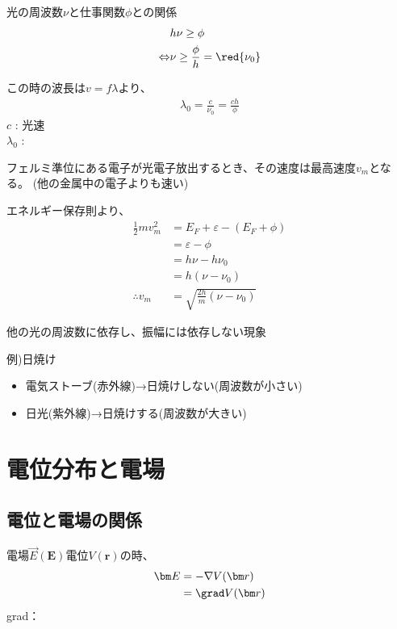 \documentclass[12pt]{ltjsarticle}
\begin{document}
光の周波数$\nu$と仕事関数$\phi$との関係
\begin{align*}
&h\nu\ge\phi\\
\Leftrightarrow&\nu\ge\frac\phi h=\red{\nu_0}
\end{align*}

この時の波長は$v=f\lambda$より、
\begin{align*}
\lambda_0=\frac c{\nu_0}=\frac{ch}\phi
\end{align*}
$c$ : 光速\\
$\lambda_0$ : 


フェルミ準位にある電子が光電子放出するとき、その速度は最高速度$v_m$となる。
(他の金属中の電子よりも速い)

エネルギー保存則より、
\begin{align*}
\frac12mv_m^2&=E_F+\varepsilon-(E_F+\phi)\\
&=\varepsilon-\phi\\
&=h\nu-h\nu_0\\
&=h(\nu-\nu_0)\\
\therefore v_m&=\sqrt{\frac{2h}m (\nu-\nu_0)}
\end{align*}

他の光の周波数に依存し、振幅には依存しない現象

例)日焼け
\begin{itemize}
\item 電気ストーブ(赤外線)→日焼けしない(周波数が小さい)
\item 日光(紫外線)→日焼けする(周波数が大きい)
\end{itemize}

\clearpage
\section{電位分布と電場}
\subsection{電位と電場の関係}
電場$\vec E(\bm E)$電位$V(\bm r)$の時、
\begin{align*}
\bm E&=-\nabla V(\bm r)\\
&=\grad V(\bm r)
\end{align*}
grad：

\newcommand{\vi}[0]{\bm i}
\newcommand{\vj}[0]{\bm j}
\newcommand{\vk}[0]{\bm k}
\newcommand{\vE}[0]{\bm E}
\end{document}

